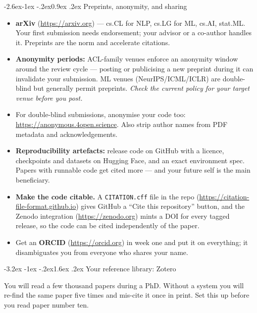 \documentclass[11pt,a4paper]{article}
\makeatletter
\renewcommand\section{\@startsection{section}{1}{\z@}%
  {-3.2ex \@plus -1ex \@minus -.2ex}{1.6ex \@plus.2ex}%
  {\normalfont\Large\bfseries\color{brand}}}
\renewcommand\subsection{\@startsection{subsection}{2}{\z@}%
  {-2.6ex\@plus -1ex \@minus -.2ex}{0.9ex \@plus .2ex}%
  {\normalfont\large\bfseries\color{brandlight}}}
\newcommand{\code}[1]{\texttt{\small #1}}
\makeatother
\begin{document}
\subsection{Preprints, anonymity, and sharing}

\begin{itemize}
  \item \textbf{arXiv} (\url{https://arxiv.org}) --- cs.CL for NLP, cs.LG for
        ML, cs.AI, stat.ML. Your first submission needs endorsement; your
        advisor or a co-author handles it. Preprints are the norm and
        accelerate citations.
  \item \textbf{Anonymity periods:} ACL-family venues enforce an anonymity
        window around the review cycle --- posting or publicising a new
        preprint during it can invalidate your submission. ML venues
        (NeurIPS/ICML/ICLR) are double-blind but generally permit preprints.
        \emph{Check the current policy for your target venue before you post.}
  \item For double-blind submissions, anonymise your code too:
        \url{https://anonymous.4open.science}. Also strip author names from
        PDF metadata and acknowledgements.
  \item \textbf{Reproducibility artefacts:} release code on GitHub with a
        licence, checkpoints and datasets on Hugging Face, and an
        exact environment spec. Papers with runnable code get cited more ---
        and your future self is the main beneficiary.
  \item \textbf{Make the code citable.} A \code{CITATION.cff} file in the
        repo (\url{https://citation-file-format.github.io}) gives GitHub a
        ``Cite this repository'' button, and the Zenodo integration
        (\url{https://zenodo.org}) mints a DOI for every tagged release, so
        the code can be cited independently of the paper.
  \item Get an \textbf{ORCID} (\url{https://orcid.org}) in week one and put it
        on everything; it disambiguates you from everyone who shares your name.
\end{itemize}

\section{Your reference library: Zotero}
\label{sec:zotero}

You will read a few thousand papers during a PhD. Without a system you will
re-find the same paper five times and mis-cite it once in print. Set this up
before you read paper number ten.
\end{document}
